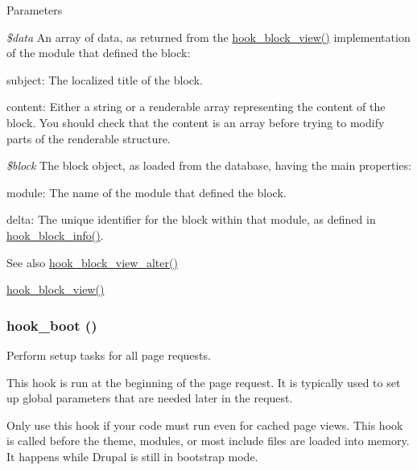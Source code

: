 \begin{DoxyParams}{Parameters}
\item[{\em \$data}]An array of data, as returned from the \hyperlink{group__hooks_gaa14092a3e74cdc57aa295100cfd6860d}{hook\_\-block\_\-view()} implementation of the module that defined the block:
\begin{DoxyItemize}
\item subject: The localized title of the block.
\item content: Either a string or a renderable array representing the content of the block. You should check that the content is an array before trying to modify parts of the renderable structure. 
\end{DoxyItemize}\item[{\em \$block}]The block object, as loaded from the database, having the main properties:
\begin{DoxyItemize}
\item module: The name of the module that defined the block.
\item delta: The unique identifier for the block within that module, as defined in \hyperlink{group__hooks_ga2bd926c3e90deeba0c3ba64fb3c64d73}{hook\_\-block\_\-info()}.
\end{DoxyItemize}\end{DoxyParams}
\begin{DoxySeeAlso}{See also}
\hyperlink{group__hooks_ga65868e8e24bb04e5eb9e533c4d413b10}{hook\_\-block\_\-view\_\-alter()} 

\hyperlink{group__hooks_gaa14092a3e74cdc57aa295100cfd6860d}{hook\_\-block\_\-view()} 
\end{DoxySeeAlso}
\hypertarget{group__hooks_ga9ac1dfffdc69471a3d00d67503c71577}{
\subsubsection[{hook\_\-boot}]{\setlength{\rightskip}{0pt plus 5cm}hook\_\-boot ()}}
\label{group__hooks_ga9ac1dfffdc69471a3d00d67503c71577}
Perform setup tasks for all page requests.

This hook is run at the beginning of the page request. It is typically used to set up global parameters that are needed later in the request.

Only use this hook if your code must run even for cached page views. This hook is called before the theme, modules, or most include files are loaded into memory. It happens while Drupal is still in bootstrap mode.

